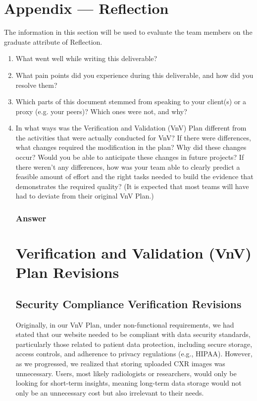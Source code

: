\documentclass[12pt, titlepage]{article}
\begin{document}
\section*{Appendix --- Reflection}

The information in this section will be used to evaluate the team members on the
graduate attribute of Reflection.



\begin{enumerate}
  \item What went well while writing this deliverable? 
  \item What pain points did you experience during this deliverable, and how
    did you resolve them?
  \item Which parts of this document stemmed from speaking to your client(s) or
  a proxy (e.g. your peers)? Which ones were not, and why?
  \item In what ways was the Verification and Validation (VnV) Plan different
  from the activities that were actually conducted for VnV?  If there were
  differences, what changes required the modification in the plan?  Why did
  these changes occur?  Would you be able to anticipate these changes in future
  projects?  If there weren't any differences, how was your team able to clearly
  predict a feasible amount of effort and the right tasks needed to build the
  evidence that demonstrates the required quality?  (It is expected that most
  teams will have had to deviate from their original VnV Plan.)


  \subsubsection{Answer}
  \section{Verification and Validation (VnV) Plan Revisions}

  \subsection{Security Compliance Verification Revisions}
  
  Originally, in our VnV Plan, under non-functional requirements, we had stated that our website needed to be compliant with data security standards, particularly those related to patient data protection, including secure storage, access controls, and adherence to privacy regulations (e.g., HIPAA). However, as we progressed, we realized that storing uploaded CXR images was unnecessary. Users, most likely radiologists or researchers, would only be looking for short-term insights, meaning long-term data storage would not only be an unnecessary cost but also irrelevant to their needs. 
  

\end{enumerate}
\end{document}
